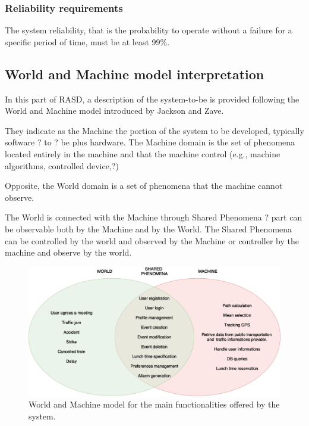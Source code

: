 \documentclass{article}
\begin{document}
	
	\subsubsection{Reliability requirements}
	The system reliability, that is the probability to operate without a failure for a specific period of time, must be at least 99\%.
	
	
	\subsection{World and Machine model interpretation}
	In this part of RASD, a description of the system-to-be is provided following the World and Machine model introduced by Jackson and Zave.
	
	\bigskip
	They indicate as the Machine the portion of the system to be developed, typically software ? to ? be plus hardware. The Machine domain is the set of phenomena located entirely in the machine and that the machine control (e.g., machine algorithms, controlled device,?)
	
	\bigskip
	Opposite, the World domain is a set of phenomena that the machine cannot observe.

	\bigskip
	The World is connected with the Machine through Shared Phenomena ? part can be observable both by the Machine and by the World. The Shared Phenomena can be controlled by the world and observed by the Machine or controller by the machine and observe by the world.
	
	\bigskip
	\bigskip
	\begin{figure}[htbp]
		\begin{center}
		\includegraphics[width=\textwidth]{img/WorldAndMachineModel.png}
		\caption{World and Machine model for the main functionalities offered by the system.}
		\label{default}
		\end{center}
	\end{figure}
\end{document}
